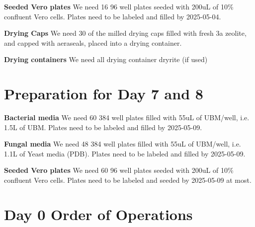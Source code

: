 \documentclass{article}
\begin{document}
\textbf{Seeded Vero plates} We need 16 96 well plates seeded with 200uL of 10\% confluent Vero cells. Plates need to be labeled and filled by 2025-05-04.

\textbf{Drying Caps} We need 30 of the milled drying caps filled with fresh 3a zeolite, and capped with aeraseals, placed into a drying container. 

\textbf{Drying containers} We need all drying container dryrite (if used) 


\section{Preparation for Day 7 and 8}\label{sec:day7-prep}
\textbf{Bacterial media} We need 60 384 well plates filled with 55uL of UBM/well, i.e. 1.5L of UBM. Plates need to be labeled and filled by 2025-05-09.

\textbf{Fungal media} We need 48 384 well plates filled with 55uL of UBM/well, i.e. 1.1L of Yeast media (PDB). Plates need to be labeled and filled by 2025-05-09.

\textbf{Seeded Vero plates} We need 60 96 well plates seeded with 200uL of 10\% confluent Vero cells. Plates need to be labeled and seeded by 2025-05-09 at most. 

\section{Day 0 Order of Operations} \label{day0instructions}
\end{document}
